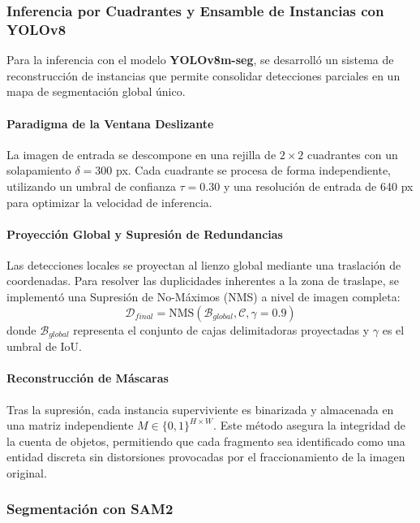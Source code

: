\subsubsection{Inferencia por Cuadrantes y Ensamble de Instancias con YOLOv8}

Para la inferencia con el modelo \textbf{YOLOv8m-seg}, se desarrolló un sistema de reconstrucción de instancias que permite consolidar detecciones parciales en un mapa de segmentación global único.

\paragraph{Paradigma de la Ventana Deslizante}
La imagen de entrada se descompone en una rejilla de $2 \times 2$ cuadrantes con un solapamiento $\delta = 300$ px. Cada cuadrante se procesa de forma independiente, utilizando un umbral de confianza $\tau = 0.30$ y una resolución de entrada de 640 px para optimizar la velocidad de inferencia.

\paragraph{Proyección Global y Supresión de Redundancias}
Las detecciones locales se proyectan al lienzo global mediante una traslación de coordenadas. Para resolver las duplicidades inherentes a la zona de traslape, se implementó una Supresión de No-Máximos (NMS) a nivel de imagen completa:
\begin{equation}
	\mathcal{D}_{final} = \text{NMS}(\mathcal{B}_{global}, \mathcal{C}, \gamma = 0.9)
\end{equation}
donde $\mathcal{B}_{global}$ representa el conjunto de cajas delimitadoras proyectadas y $\gamma$ es el umbral de IoU. 

\paragraph{Reconstrucción de Máscaras}
Tras la supresión, cada instancia superviviente es binarizada y almacenada en una matriz independiente $M \in \{0, 1\}^{H \times W}$. Este método asegura la integridad de la cuenta de objetos, permitiendo que cada fragmento sea identificado como una entidad discreta sin distorsiones provocadas por el fraccionamiento de la imagen original.

\subsubsection{Segmentación con SAM2}

